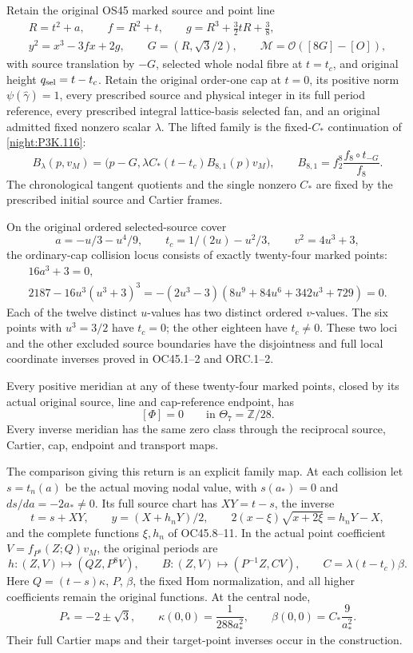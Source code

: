 \begin{theorem}\label{night:P3K.119}
Retain the original OS45 marked source and point line
\[
\begin{gathered}
R=t^2+a,\qquad f=R^2+t,\qquad
g=R^3+\frac32tR+\frac38,\\
y^2=x^3-3fx+2g,\qquad G=(R,\sqrt3/2),\qquad
\mathcal M=\mathcal O([8G]-[O]),
\end{gathered}
\]
with source translation by \(-G\), selected whole nodal fibre at
\(t=t_c\), and original height \(q_{\rm sel}=t-t_c\). Retain the
original order-one cap at \(t=0\), its positive norm
\(\psi(\widehat\gamma)=1\), every prescribed source and physical
integer in its full period reference, every prescribed integral
lattice-basis selected fan, and an original admitted fixed nonzero
scalar \(\lambda\).
The lifted family is the fixed-$C_*$ continuation of
\cref{night:P3K.116}:
\[
 B_\lambda(p,v_M)=
 \bigl(p-G,\lambda C_*(t-t_c)B_{8,1}(p)v_M\bigr),
 \qquad B_{8,1}=f_2^8\frac{f_8\circ t_{-G}}{f_8}.
\]
The chronological tangent quotients and the single nonzero $C_*$
are fixed by the prescribed initial source and Cartier frames.

On the original ordered selected-source cover
\[
a=-u/3-u^4/9,\qquad t_c=1/(2u)-u^2/3,\qquad
v^2=4u^3+3,
\]
the ordinary-cap collision locus consists of exactly twenty-four
marked points:
\[
\begin{gathered}
16a^3+3=0,\\
2187-16u^3(u^3+3)^3
=-(2u^3-3)(8u^9+84u^6+342u^3+729)=0.
\end{gathered}
\]
Each of the twelve distinct \(u\)-values has two distinct ordered
\(v\)-values. The six points with \(u^3=3/2\) have \(t_c=0\);
the other eighteen have \(t_c\ne0\). These two loci and the other
excluded source boundaries have the disjointness and full local
coordinate inverses proved in OC45.1--2 and ORC.1--2.

Every positive meridian at any of these twenty-four marked points,
closed by its actual original source, line and cap-reference
endpoint, has
\[
[\Phi]=0\qquad\text{in }\Theta_7=\mathbb Z/28.
\]
Every inverse meridian has the same zero class through the
reciprocal source, Cartier, cap, endpoint and transport maps.

The comparison giving this return is an explicit family map.
At each collision let \(s=t_n(a)\) be the actual moving nodal
value, with \(s(a_*)=0\) and \(ds/da=-2a_*\ne0\). Its full
source chart has \(XY=t-s\), the inverse
\[
t=s+XY,\qquad y=(X+h_nY)/2,\qquad
2(x-\xi)\sqrt{x+2\xi}=h_nY-X,
\]
and the complete functions \(\xi,h_n\) of OC45.8--11.
In the actual point coefficient \(V=f_{P^8}(Z;Q)v_M\), the
original periods are
\[
h:(Z,V)\longmapsto(QZ,P^8V),\qquad
B:(Z,V)\longmapsto(P^{-1}Z,CV),\qquad
C=\lambda(t-t_c)\beta .
\]
Here \(Q=(t-s)\kappa\), \(P\), \(\beta\), the fixed Hom
normalization, and all higher coefficients remain the original
functions. At the central node,
\[
P_*=-2\pm\sqrt3,\qquad
\kappa(0,0)=\frac1{288a_*^2},\qquad
\beta(0,0)=C_*\frac9{a_*^2}.
\]
Their full Cartier maps and their target-point inverses occur in
the construction.


\end{theorem}
